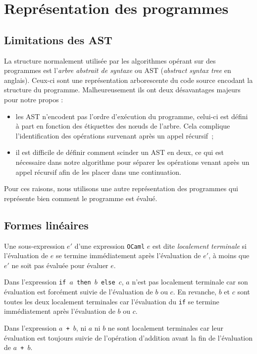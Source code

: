 \section{Représentation des programmes}
\subsection{Limitations des AST}

La structure normalement utilisée par les algorithmes opérant sur des programmes
est l'\textit{arbre abstrait de syntaxe} ou AST (\textit{abstract syntax tree}
en anglais). Ceux-ci sont une représentation arborescente du code source
encodant la structure du programme. Malheureusement ils ont deux désavantages
majeurs pour notre propos :

\begin{itemize}
    \item les AST n'encodent pas l'ordre d'exécution du programme, celui-ci est
          défini à part en fonction des étiquettes des nœuds de l'arbre. Cela
          complique l'identification des opérations survenant après un appel
          récursif~;
    \item il est difficile de définir comment scinder un AST en deux, ce qui est
          nécessaire dans notre algorithme pour séparer les opérations venant
          après un appel récursif afin de les placer dans une continuation.
\end{itemize}

Pour ces raisons, nous utilisons une autre représentation des programmes qui
représente bien comment le programme est évalué.

\subsection{Formes linéaires}

\begin{definition}
    Une sous-expression $e'$ d'une expression \texttt{OCaml} $e$ est dite
    \textit{localement terminale} si l'évaluation de $e$ se termine
    immédiatement après l'évaluation de $e'$, à moins que $e'$ ne soit pas
    évaluée pour évaluer $e$.
\end{definition}

\begin{example}
    Dans l'expression \texttt{if }$a$\texttt{ then }$b$\texttt{ else }$c$, $a$
    n'est pas localement terminale car son évaluation est forcément suivie de
    l'évaluation de $b$ ou $c$. En revanche, $b$ et $c$ sont toutes les deux
    localement terminales car l'évaluation du \texttt{if} se termine
    immédiatement après l'évaluation de $b$ ou $c$.

    Dans l'expression $a$\texttt{ + }$b$, ni $a$ ni $b$ ne sont localement
    terminales car leur évaluation est toujours suivie de l'opération d'addition
    avant la fin de l'évaluation de $a$\texttt{ + }$b$.
\end{example}

